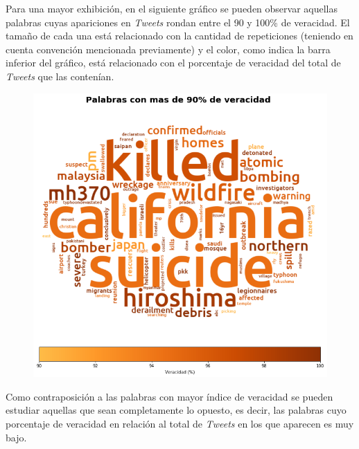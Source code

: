 \documentclass[titlepage,a4paper]{article}
\begin{document}
    Para una mayor exhibición, en el siguiente gráfico se pueden observar aquellas palabras cuyas apariciones en \textit{Tweets} rondan entre el 90 y 100\% de veracidad. El tamaño de cada una está relacionado con la cantidad de repeticiones (teniendo en cuenta convención mencionada previamente) y el color, como indica la barra inferior del gráfico, está relacionado con el porcentaje de veracidad del total de \textit{Tweets} que las contenían.
    \begin{figure}[H]
    \centering
    \includegraphics[width=1\textwidth]{graficos/Analisis Lexico Grafico/palabras_con_mas_de_90_de_veracidad.png}
    \caption{} 
    \end{figure}
    
    Como contraposición a las palabras con mayor índice de veracidad se pueden estudiar aquellas que sean completamente lo opuesto, es decir, las palabras cuyo porcentaje de veracidad en relación al total de \textit{Tweets} en los que aparecen es muy bajo. 
    
\end{document}
